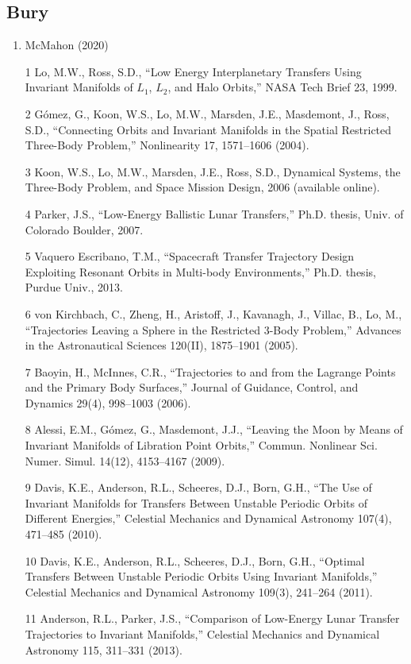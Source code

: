 \documentclass[12pt]{article}
\begin{document}
\subsection*{Bury}
\begin{enumerate}
\item McMahon (2020)
\item [1] Lo, M.W., Ross, S.D., ``Low Energy Interplanetary Transfers Using Invariant Manifolds of $L_1$, $L_2$, and Halo Orbits,'' NASA Tech Brief 23, 1999.
\item [2] Gómez, G., Koon, W.S., Lo, M.W., Marsden, J.E., Masdemont, J., Ross, S.D., ``Connecting Orbits and Invariant Manifolds in the Spatial Restricted Three-Body Problem,'' Nonlinearity 17, 1571--1606 (2004).
\item [3] Koon, W.S., Lo, M.W., Marsden, J.E., Ross, S.D., Dynamical Systems, the Three-Body Problem, and Space Mission Design, 2006 (available online).
\item [4] Parker, J.S., ``Low-Energy Ballistic Lunar Transfers,'' Ph.D. thesis, Univ. of Colorado Boulder, 2007.
\item [5] Vaquero Escribano, T.M., ``Spacecraft Transfer Trajectory Design Exploiting Resonant Orbits in Multi-body Environments,'' Ph.D. thesis, Purdue Univ., 2013.
\item [6] von Kirchbach, C., Zheng, H., Aristoff, J., Kavanagh, J., Villac, B., Lo, M., ``Trajectories Leaving a Sphere in the Restricted 3-Body Problem,'' Advances in the Astronautical Sciences 120(II), 1875--1901 (2005).
\item [7] Baoyin, H., McInnes, C.R., ``Trajectories to and from the Lagrange Points and the Primary Body Surfaces,'' Journal of Guidance, Control, and Dynamics 29(4), 998--1003 (2006).
\item [8] Alessi, E.M., Gómez, G., Masdemont, J.J., ``Leaving the Moon by Means of Invariant Manifolds of Libration Point Orbits,'' Commun. Nonlinear Sci. Numer. Simul. 14(12), 4153--4167 (2009).
\item [9] Davis, K.E., Anderson, R.L., Scheeres, D.J., Born, G.H., ``The Use of Invariant Manifolds for Transfers Between Unstable Periodic Orbits of Different Energies,'' Celestial Mechanics and Dynamical Astronomy 107(4), 471--485 (2010).
\item [10] Davis, K.E., Anderson, R.L., Scheeres, D.J., Born, G.H., ``Optimal Transfers Between Unstable Periodic Orbits Using Invariant Manifolds,'' Celestial Mechanics and Dynamical Astronomy 109(3), 241--264 (2011).
\item [11] Anderson, R.L., Parker, J.S., ``Comparison of Low-Energy Lunar Transfer Trajectories to Invariant Manifolds,'' Celestial Mechanics and Dynamical Astronomy 115, 311--331 (2013).

\end{enumerate}
\end{document}
